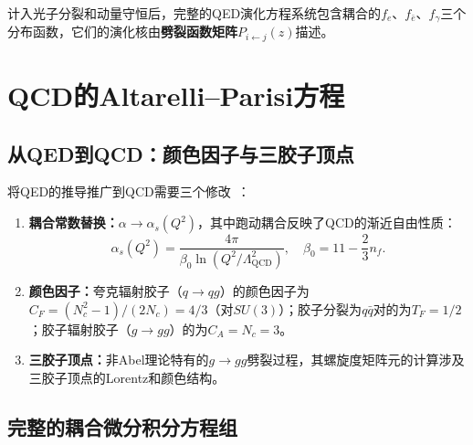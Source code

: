 \documentclass[12pt,a4paper]{ctexart}
\theoremstyle{definition}
\begin{document}
计入光子分裂和动量守恒后，完整的QED演化方程系统包含耦合的$f_e$、$f_{\bar e}$、$f_\gamma$三个分布函数，它们的演化核由\textbf{劈裂函数矩阵}$P_{i\leftarrow j}(z)$描述。

\section{QCD的Altarelli--Parisi方程}

\subsection{从QED到QCD：颜色因子与三胶子顶点}

将QED的推导推广到QCD需要三个修改~\cite{PeskinSchroeder1995}：

\begin{enumerate}[leftmargin=*]
    \item \textbf{耦合常数替换：}$\alpha \to \alpha_s(Q^2)$，其中跑动耦合反映了QCD的渐近自由性质：
    \begin{equation}
    \alpha_s(Q^2) = \frac{4\pi}{\beta_0 \ln(Q^2/\Lambda_{\text{QCD}}^2)}, \quad \beta_0 = 11 - \frac{2}{3}n_f.
    \label{eq:running_alpha}
    \end{equation}

    \item \textbf{颜色因子：}夸克辐射胶子（$q\to qg$）的颜色因子为$C_F = (N_c^2-1)/(2N_c) = 4/3$（对$SU(3)$）；胶子分裂为$q\bar q$对的为$T_F = 1/2$；胶子辐射胶子（$g\to gg$）的为$C_A = N_c = 3$。

    \item \textbf{三胶子顶点：}非Abel理论特有的$g\to gg$劈裂过程，其螺旋度矩阵元的计算涉及三胶子顶点的Lorentz和颜色结构。
\end{enumerate}

\subsection{完整的耦合微分积分方程组}
\end{document}
